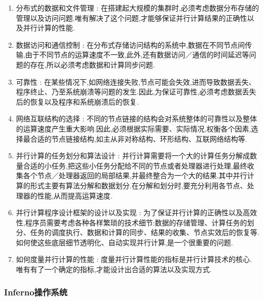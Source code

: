 \documentclass[paper=a4]{ctexart} %
\numberwithin{equation}{section} %
\numberwithin{figure}{section} %
\numberwithin{table}{section} %
\begin{document}
\begin{enumerate}
\item 分布式的数据和文件管理 : 在搭建起大规模的集群时,必须考虑数据分布存储的管理以及访问问题.唯有解决了这个问题,才能够保证并行计算结果的正确性以及并行计算的性能.
\item 数据访问和通信控制 : 在分布式存储访问结构的系统中,数据在不同节点间传输,由于不同节点的运算速度不一致,此外,还有数据访问／通信的时间延迟等问题的存在,所以必须考虑数据和计算同步问题.
\item 可靠性 : 在某些情况下,如网络连接失败,节点可能会失效,进而导致数据丢失、程序终止、乃至系统崩溃等问题的发生.因此,为保证可靠性,必须考虑数据丢失后的恢复以及程序和系统崩溃后的恢复.
\item 网络互联结构的选择 : 不同的节点链接的结构会对系统整体的可靠性以及整体的运算速度产生重大影响.因此,必须根据实际需要、实际情况,权衡各个因素,选择最合适的节点链接结构,如主从非对称结构、环形结构、互联网络结构等.
\item 并行计算的任务划分和算法设计 : 并行计算需要将一个大的计算任务分解成数量合适的小任务,把这些小任务分配给不同的节点或者处理器进行处理,最终收集各个节点／处理器返回的局部结果,并最终整合为一个大的结果.其中并行计算的形式主要有算法分解和数据划分.在分解和划分时,要充分利用各节点、处理器的性能,从而提高运算速度.
\item 并行计算程序设计框架的设计以及实现 : 为了保证并行计算的正确性以及高效性,程序员需要考虑各种各样繁琐的技术细节:数据的存储管理、计算任务的划分、任务的调度执行、数据和计算的同步、结果的收集、节点实效后的恢复等.如何使这些底层细节透明化、自动实现并行计算,是一个很重要的问题.
\item 如何度量并行计算的性能 : 度量并行计算性能的指标是并行计算技术的核心.
唯有有了一个确定的指标,才能设计出合适的算法以及实现方式.
\end{enumerate}

\subsubsection{Inferno操作系统}
\end{document}
